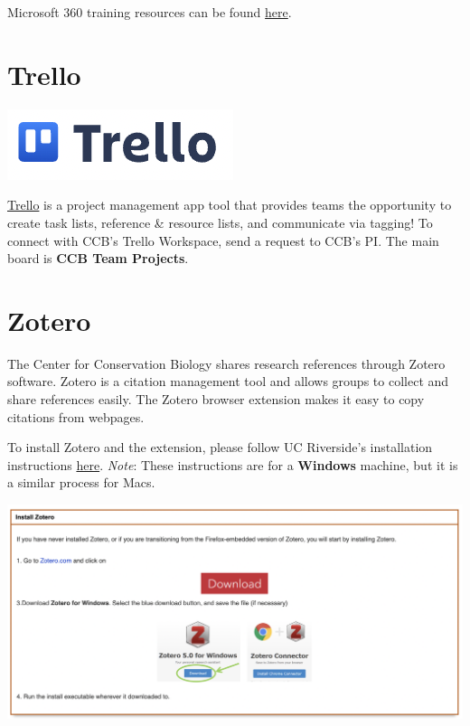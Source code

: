 \documentclass[
]{book}
\begin{document}
Microsoft 360 training resources can be found \href{https://support.microsoft.com/en-us/training}{here}.

\hypertarget{trello}{%
\section{Trello}\label{trello}}

\begin{flushleft}\includegraphics{images/trello} \end{flushleft}

\href{https://trello.com/en}{Trello} is a project management app tool that provides teams the opportunity to create task lists, reference \& resource lists, and communicate via tagging! To connect with CCB's Trello Workspace, send a request to CCB's PI. The main board is \textbf{CCB Team Projects}.

\hypertarget{zotero}{%
\section{Zotero}\label{zotero}}

The Center for Conservation Biology shares research references through Zotero software. Zotero is a citation management tool and allows groups to collect and share references easily. The Zotero browser extension makes it easy to copy citations from webpages.

To install Zotero and the extension, please follow UC Riverside's installation instructions \href{https://guides.lib.ucr.edu/c.php?g=171064}{here}. \emph{Note}: These instructions are for a \textbf{Windows} machine, but it is a similar process for Macs.

\begin{center}\includegraphics{images/zoteroinstall} \end{center}
\end{document}
